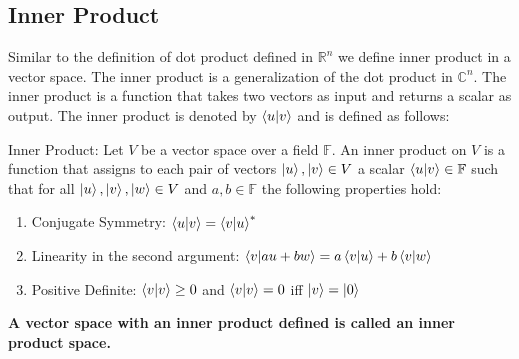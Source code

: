 \subsection{Inner Product}
Similar to the definition of dot product defined in $\mathbb{R}^n$ we define inner product in a vector space. The inner product is a generalization of the dot product in $\mathbb{C}^n$.
The inner product is a function that takes two vectors as input and returns a scalar as output. The inner product is denoted by $\braket{u|v}$ and is defined as follows:
\begin{definition}
    Inner Product: Let $V$ be a vector space over a field $\mathbb{F}$. An inner product on $V$ is a function that assigns to each pair of vectors $\ket{u},\ket{v}\in V$ a scalar $\braket{u|v}\in\mathbb{F}$ such that for all $\ket{u},\ket{v},\ket{w}\in V$ and $a,b\in\mathbb{F}$ the following properties hold:
    \begin{enumerate}
        \item Conjugate Symmetry: $\braket{u|v}={\braket{v|u}}^*$
        \item Linearity in the second argument: $\braket{v|au+bw}=a\braket{v|u}+b\braket{v|w}$
        \item Positive Definite: $\braket{v|v}\geq 0$ and $\braket{v|v}=0$ iff $\ket{v}=\ket{0}$
    \end{enumerate}
\end{definition}

\textbf{A vector space with an inner product defined is called an inner product space.}


